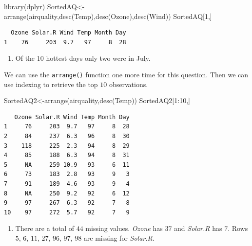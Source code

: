 \documentclass[
  letterpaper,
  DIV=11,
  numbers=noendperiod]{scrreprt}
\newenvironment{Shaded}{\begin{snugshade}}{\end{snugshade}}
\newcommand{\DecValTok}[1]{\textcolor[rgb]{0.68,0.00,0.00}{#1}}
\newcommand{\FunctionTok}[1]{\textcolor[rgb]{0.28,0.35,0.67}{#1}}
\newcommand{\NormalTok}[1]{\textcolor[rgb]{0.00,0.23,0.31}{#1}}
\newcommand{\OtherTok}[1]{\textcolor[rgb]{0.00,0.23,0.31}{#1}}
\newcommand{\SpecialCharTok}[1]{\textcolor[rgb]{0.37,0.37,0.37}{#1}}
\providecommand{\tightlist}{%
  \setlength{\itemsep}{0pt}\setlength{\parskip}{0pt}}\usepackage{longtable,booktabs,array}
\begin{document}
\begin{Shaded}
\begin{Highlighting}[numbers=left,,]
\FunctionTok{library}\NormalTok{(dplyr)}
\NormalTok{SortedAQ}\OtherTok{\textless{}{-}}\FunctionTok{arrange}\NormalTok{(airquality,}\FunctionTok{desc}\NormalTok{(Temp),}\FunctionTok{desc}\NormalTok{(Ozone),}\FunctionTok{desc}\NormalTok{(Wind))}
\NormalTok{SortedAQ[}\DecValTok{1}\NormalTok{,]}
\end{Highlighting}
\end{Shaded}

\begin{verbatim}
  Ozone Solar.R Wind Temp Month Day
1    76     203  9.7   97     8  28
\end{verbatim}

\begin{blackbox}

\begin{enumerate}
\def\labelenumi{\arabic{enumi}.}
\setcounter{enumi}{1}
\tightlist
\item
  Of the \(10\) hottest days only two were in July.
\end{enumerate}

\end{blackbox}

We can use the \texttt{arrange()} function one more time for this
question. Then we can use indexing to retrieve the top \(10\)
observations.

\begin{Shaded}
\begin{Highlighting}[numbers=left,,]
\NormalTok{SortedAQ2}\OtherTok{\textless{}{-}}\FunctionTok{arrange}\NormalTok{(airquality,}\FunctionTok{desc}\NormalTok{(Temp))}
\NormalTok{SortedAQ2[}\DecValTok{1}\SpecialCharTok{:}\DecValTok{10}\NormalTok{,]}
\end{Highlighting}
\end{Shaded}

\begin{verbatim}
   Ozone Solar.R Wind Temp Month Day
1     76     203  9.7   97     8  28
2     84     237  6.3   96     8  30
3    118     225  2.3   94     8  29
4     85     188  6.3   94     8  31
5     NA     259 10.9   93     6  11
6     73     183  2.8   93     9   3
7     91     189  4.6   93     9   4
8     NA     250  9.2   92     6  12
9     97     267  6.3   92     7   8
10    97     272  5.7   92     7   9
\end{verbatim}

\begin{blackbox}

\begin{enumerate}
\def\labelenumi{\arabic{enumi}.}
\setcounter{enumi}{2}
\tightlist
\item
  There are a total of \(44\) missing values. \emph{Ozone} has \(37\)
  and \emph{Solar.R} has \(7\). Rows \(5\), \(6\), \(11\), \(27\),
  \(96\), \(97\), \(98\) are missing for \emph{Solar.R}.
\end{enumerate}

\end{blackbox}
\end{document}
